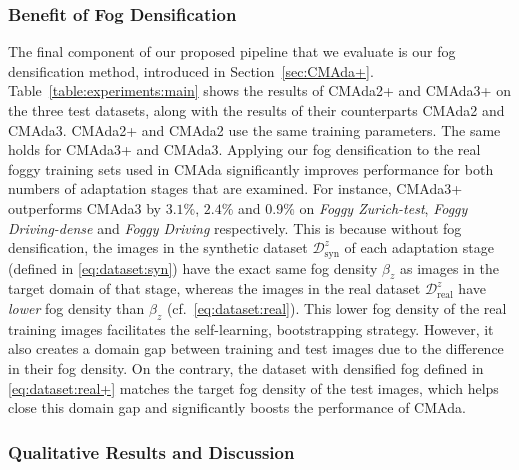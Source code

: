 \documentclass[twocolumn]{svjour3}          \smartqed  \usepackage{graphicx}
\begin{document}
\subsubsection{Benefit of Fog Densification}
\label{sec:benefit:fog:densification}

The final component of our proposed pipeline that we evaluate is our fog densification method, introduced in Section~\ref{sec:CMAda+}. Table~\ref{table:experiments:main} shows the results of CMAda2+ and CMAda3+ on the three test datasets, along with the results of their counterparts CMAda2 and CMAda3. CMAda2+ and CMAda2 use the same training parameters. The same holds for CMAda3+ and CMAda3.
Applying our fog densification to the real foggy training sets used in CMAda significantly improves performance for both numbers of adaptation stages that are examined. For instance, CMAda3+ outperforms CMAda3 by $3.1\%$, $2.4\%$ and $0.9\%$ on \emph{Foggy Zurich-test}, \emph{Foggy Driving-dense} and \emph{Foggy Driving} respectively.
This is because without fog densification, the images in the synthetic dataset $\mathcal{D}_{\text{syn}}^z$ of each adaptation stage (defined in \eqref{eq:dataset:syn}) have the exact same fog density $\beta_z$ as images in the target domain of that stage, whereas the images in the real dataset $\mathcal{D}_{\text{real}}^z$ have \emph{lower} fog density than $\beta_z$ (cf.\ \eqref{eq:dataset:real}). This lower fog density of the real training images facilitates the self-learning, bootstrapping strategy. However, it also creates a domain gap between training and test images due to the difference in their fog density. On the contrary, the dataset with densified fog defined in \eqref{eq:dataset:real+} matches the target fog density of the test images, which helps close this domain gap and significantly boosts the performance of CMAda.

\subsubsection{Qualitative Results and Discussion}
\label{sec:qualitative:results}
\end{document}
